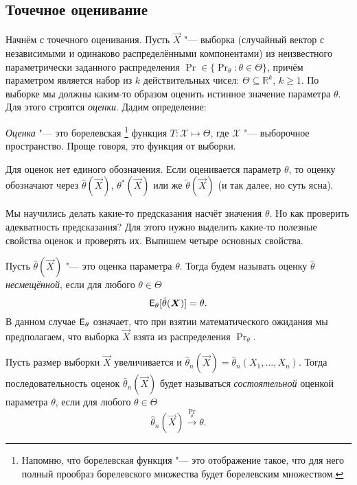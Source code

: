 \subsection{Точечное оценивание}
Начнём с точечного оценивания.
Пусть $\vec{X}$ "--- выборка (случайный вектор с независимыми и одинаково распределёнными компонентами) из неизвестного параметрически заданного распределения $\Pr \in \{\Pr_{\theta} \colon \theta \in \Theta\}$, причём параметром является набор из $k$ действительных чисел: $\Theta \subseteq \mathbb{R}^{k}$, $k \geq 1$.
По выборке мы должны каким-то образом оценить истинное значение параметра $\theta$.
Для этого строятся \emph{оценки}.
Дадим определение:
\begin{definition}
	\emph{Оценка} "--- это борелевская%
	\footnote{Напомню, что борелевская функция "--- это отображение такое, что для него полный прообраз борелевского множества будет борелевским множеством.} %
	функция $T \colon \mathcal{X} \mapsto \Theta$, где $\mathcal{X}$ "--- выборочное пространство.
	Проще говоря, это функция от выборки.
\end{definition}

Для оценок нет единого обозначения.
Если оценивается параметр $\theta$, то оценку обозначают через $\hat{\theta}(\vec{X})$, $\theta^{*}(\vec{X})$ или же $\tilde{\theta}(\vec{X})$ (и так далее, но суть ясна).

Мы научились делать какие-то предсказания насчёт значения $\theta$.
Но как проверить адекватность предсказания?
Для этого нужно выделить какие-то полезные свойства оценок и проверять их.
Выпишем четыре основных свойства.

\begin{definition}
	Пусть $\hat{\theta}(\vec{X})$ "--- это оценка параметра $\theta$.
	Тогда будем называть оценку $\hat{\theta}$ \emph{несмещённой}, если для любого $\theta \in \Theta$ 
	\[
		\operatorname{\mathsf{E}}_{\theta}[\hat{\theta}(\bm{X})] = \theta.
	\]
	В данном случае $\operatorname{\mathsf{E}}_{\theta}$ означает, что при взятии математического ожидания мы предполагаем, что выборка $\vec{X}$ взята из распределения $\Pr_{\theta}$.
\end{definition}

\begin{definition}
	Пусть размер выборки $\vec{X}$ увеличивается и $\hat{\theta}_{n}(\vec{X}) = \hat{\theta}_{n}(X_{1}, \ldots, X_{n})$.
	Тогда последовательность оценок $\hat{\theta}_{n}(\vec{X})$ будет называться \emph{состоятельной} оценкой параметра $\theta$, если для любого $\theta \in \Theta$
	\[
		\hat{\theta}_{n}(\vec{X}) \xrightarrow{\Pr_{\theta}} \theta.
	\]
\end{definition}

